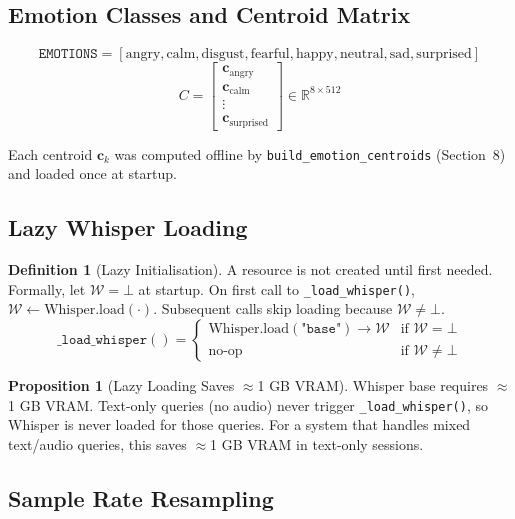\documentclass[12pt,a4paper]{article}
\theoremstyle{definition}
\newtheorem{definition}[theorem]{Definition}
\newtheorem{proposition}[theorem]{Proposition}
\theoremstyle{remark}
\begin{document}
\subsection{Emotion Classes and Centroid Matrix}

\[
  \texttt{EMOTIONS} =
  [\text{angry}, \text{calm}, \text{disgust}, \text{fearful},
   \text{happy}, \text{neutral}, \text{sad}, \text{surprised}]
\]
\[
  C = \begin{bmatrix}
    \mathbf{c}_{\text{angry}} \\
    \mathbf{c}_{\text{calm}} \\
    \vdots \\
    \mathbf{c}_{\text{surprised}}
  \end{bmatrix} \in \mathbb{R}^{8 \times 512}
\]

Each centroid $\mathbf{c}_k$ was computed offline by
\texttt{build\_emotion\_centroids} (Section~8) and loaded once at startup.

\subsection{Lazy Whisper Loading}

\begin{definition}[Lazy Initialisation]
A resource is not created until first needed.
Formally, let $\mathcal{W} = \bot$ at startup.
On first call to \texttt{\_load\_whisper()}, $\mathcal{W} \leftarrow \text{Whisper.load}(\cdot)$.
Subsequent calls skip loading because $\mathcal{W} \neq \bot$.
\[
  \texttt{\_load\_whisper}() =
  \begin{cases}
    \text{Whisper.load}(\texttt{"base"}) \to \mathcal{W}
    & \text{if } \mathcal{W} = \bot \\
    \text{no-op} & \text{if } \mathcal{W} \neq \bot
  \end{cases}
\]
\end{definition}

\begin{proposition}[Lazy Loading Saves $\approx$1 GB VRAM]
Whisper base requires $\approx$1 GB VRAM.
Text-only queries (no audio) never trigger \texttt{\_load\_whisper()},
so Whisper is never loaded for those queries.
For a system that handles mixed text/audio queries, this saves
$\approx$1 GB VRAM in text-only sessions.
\end{proposition}

\subsection{Sample Rate Resampling}
\end{document}
